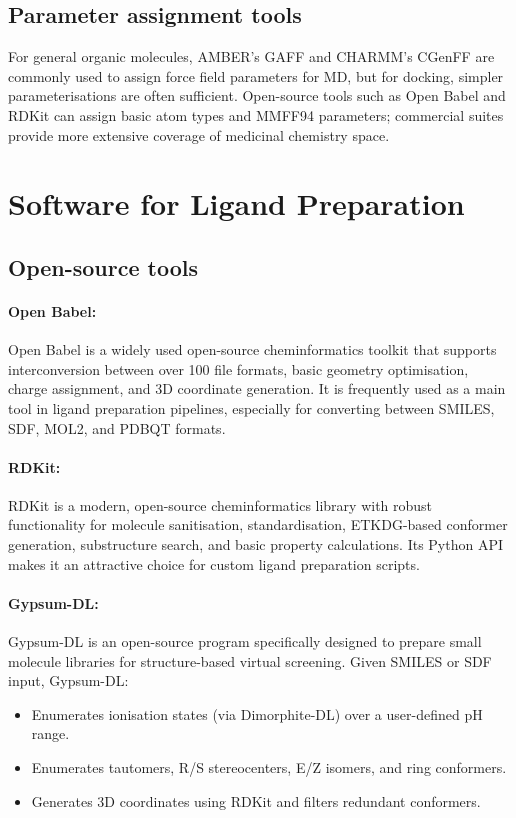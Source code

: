 \documentclass[12pt]{article}
\begin{document}
\subsection{Parameter assignment tools}

For general organic molecules, AMBER's GAFF\cite{CH6_gaff,CH6_sprenger2015general} and CHARMM's CGenFF\cite{CH6_cgenff} are commonly used to assign force field parameters for MD, but for docking, simpler parameterisations are often sufficient. Open-source tools such as Open Babel and RDKit can assign basic atom types and MMFF94 parameters; commercial suites provide more extensive coverage of medicinal chemistry space.

\section{Software for Ligand Preparation}

\subsection{Open-source tools}

\paragraph{Open Babel:} Open Babel\cite{CH6_OBoyle2011} is a widely used open-source cheminformatics toolkit that supports interconversion between over 100 file formats, basic geometry optimisation, charge assignment, and 3D coordinate generation. It is frequently used as a main tool in ligand preparation pipelines, especially for converting between SMILES, SDF, MOL2, and PDBQT formats.

\paragraph{RDKit:} RDKit\cite{CH6_bento2020open} is a modern, open-source cheminformatics library with robust functionality for molecule sanitisation, standardisation, ETKDG-based conformer generation\cite{CH6_Riniker2015}, substructure search, and basic property calculations. Its Python API makes it an attractive choice for custom ligand preparation scripts.

\paragraph{Gypsum-DL:} Gypsum-DL\cite{CH6_Ropp2019} is an open-source program specifically designed to prepare small molecule libraries for structure-based virtual screening. Given SMILES or SDF input, Gypsum-DL:
\begin{itemize}
  \item Enumerates ionisation states (via Dimorphite-DL) over a user-defined pH range.
  \item Enumerates tautomers, R/S stereocenters, E/Z isomers, and ring conformers.
  \item Generates 3D coordinates using RDKit and filters redundant conformers.
\end{itemize}
\end{document}
